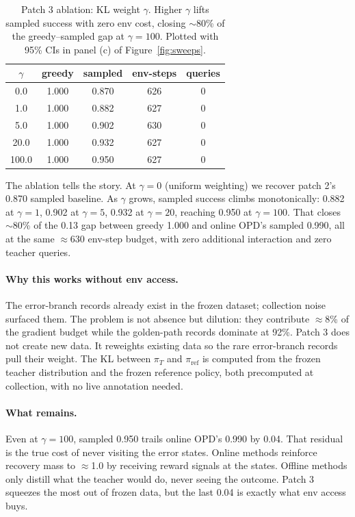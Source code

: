 \documentclass[11pt]{article}
\begin{document}
\begin{table}[h]
\centering
\small
\begin{tabular}{c c c c c}
\toprule
\textbf{$\gamma$} & \textbf{greedy} & \textbf{sampled} & \textbf{env-steps} & \textbf{queries} \\
\midrule
0.0   & 1.000 & 0.870 & 626 & 0 \\
1.0   & 1.000 & 0.882 & 627 & 0 \\
5.0   & 1.000 & 0.902 & 630 & 0 \\
20.0  & 1.000 & 0.932 & 627 & 0 \\
100.0 & 1.000 & 0.950 & 627 & 0 \\
\bottomrule
\end{tabular}
\caption{Patch 3 ablation: KL weight $\gamma$. Higher $\gamma$ lifts sampled success
with zero env cost, closing $\sim$80\% of the greedy--sampled gap at $\gamma=100$.
Plotted with 95\% CIs in panel (c) of Figure~\ref{fig:sweeps}.}
\label{tab:branch-ablation}
\end{table}

The ablation tells the story. At $\gamma=0$ (uniform weighting) we recover patch 2's
0.870 sampled baseline. As $\gamma$ grows, sampled success climbs monotonically:
0.882 at $\gamma=1$, 0.902 at $\gamma=5$, 0.932 at $\gamma=20$, reaching 0.950 at
$\gamma=100$. That closes $\sim$80\% of the 0.13 gap between greedy 1.000 and online
OPD's sampled 0.990, all at the same $\approx$630 env-step budget, with zero additional
interaction and zero teacher queries.

\paragraph{Why this works without env access.}
The error-branch records already exist in the frozen dataset; collection noise
surfaced them. The problem is not absence but dilution: they contribute
$\approx$8\% of the gradient budget while the golden-path records dominate at 92\%.
Patch 3 does not create new data. It reweights existing data so the rare error-branch
records pull their weight. The KL between $\pi_T$ and $\pi_{\mathrm{ref}}$ is computed
from the frozen teacher distribution and the frozen reference policy, both
precomputed at collection, with no live annotation needed.

\paragraph{What remains.}
Even at $\gamma=100$, sampled 0.950 trails online OPD's 0.990 by 0.04. That residual is
the true cost of never visiting the error states. Online methods reinforce
recovery mass to $\approx$1.0 by receiving reward signals at the states. Offline
methods only distill what the teacher would do, never seeing the outcome.
Patch 3 squeezes the most out of frozen data, but the last 0.04 is exactly what
env access buys.
\end{document}
